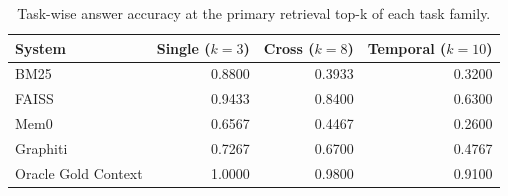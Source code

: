 \begin{table}[!t]
\centering
\scriptsize
\caption{Task-wise answer accuracy at the primary retrieval top-k of each task family.}
\label{tab:task-maink}
\setlength{\tabcolsep}{4pt}
\begin{tabular}{lrrr}
\toprule
System & Single ($k{=}3$) & Cross ($k{=}8$) & Temporal ($k{=}10$) \\
\midrule
BM25 & 0.8800 & 0.3933 & 0.3200 \\
FAISS & 0.9433 & 0.8400 & 0.6300 \\
Mem0 & 0.6567 & 0.4467 & 0.2600 \\
Graphiti & 0.7267 & 0.6700 & 0.4767 \\
Oracle Gold Context & 1.0000 & 0.9800 & 0.9100 \\
\bottomrule
\end{tabular}
\end{table}
